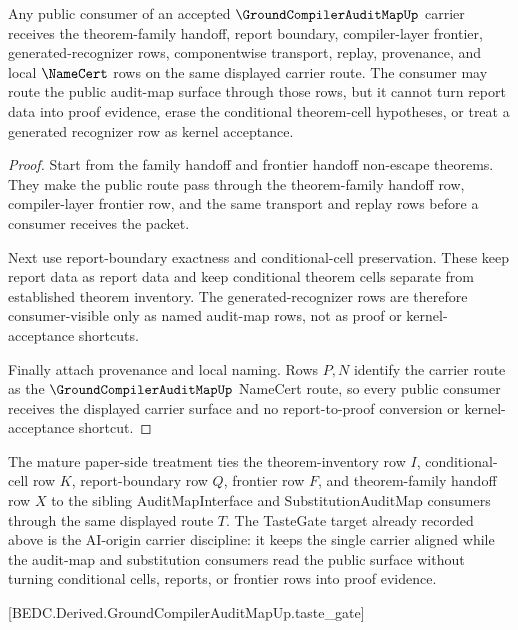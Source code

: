 \begin{theorem}
\label{thm:groundcompiler-audit-map-public-consumer-bridge}
Any public consumer of an accepted $\GroundCompilerAuditMapUp$ carrier receives the theorem-family handoff, report boundary, compiler-layer frontier, generated-recognizer rows, componentwise transport, replay, provenance, and local $\NameCert$ rows on the same displayed carrier route. The consumer may route the public audit-map surface through those rows, but it cannot turn report data into proof evidence, erase the conditional theorem-cell hypotheses, or treat a generated recognizer row as kernel acceptance.
\end{theorem}
\begin{proof}
Start from the family handoff and frontier handoff non-escape theorems. They make the public route pass through the theorem-family handoff row, compiler-layer frontier row, and the same transport and replay rows before a consumer receives the packet.

Next use report-boundary exactness and conditional-cell preservation. These keep report data as report data and keep conditional theorem cells separate from established theorem inventory. The generated-recognizer rows are therefore consumer-visible only as named audit-map rows, not as proof or kernel-acceptance shortcuts.

Finally attach provenance and local naming. Rows $P,N$ identify the carrier route as the $\GroundCompilerAuditMapUp$ NameCert route, so every public consumer receives the displayed carrier surface and no report-to-proof conversion or kernel-acceptance shortcut.
\end{proof}

The mature paper-side treatment ties the theorem-inventory row $I$, conditional-cell row $K$, report-boundary row $Q$, frontier row $F$, and theorem-family handoff row $X$ to the sibling AuditMapInterface and SubstitutionAuditMap consumers through the same displayed route $T$. The TasteGate target already recorded above is the AI-origin carrier discipline: it keeps the single carrier aligned while the audit-map and substitution consumers read the public surface without turning conditional cells, reports, or frontier rows into proof evidence.

[BEDC.Derived.GroundCompilerAuditMapUp.taste\_gate]

